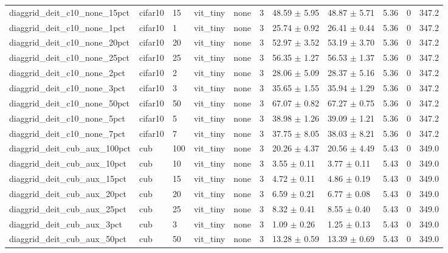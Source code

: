\begin{tabular}{lllllllllll}
diaggrid_deit_c10_none_15pct & cifar10 & 15 & vit_tiny & none & 3 & 48.59 $\pm$ 5.95 & 48.87 $\pm$ 5.71 & 5.36 & 0 & 347.2 \\
diaggrid_deit_c10_none_1pct & cifar10 & 1 & vit_tiny & none & 3 & 25.74 $\pm$ 0.92 & 26.41 $\pm$ 0.44 & 5.36 & 0 & 347.2 \\
diaggrid_deit_c10_none_20pct & cifar10 & 20 & vit_tiny & none & 3 & 52.97 $\pm$ 3.52 & 53.19 $\pm$ 3.70 & 5.36 & 0 & 347.2 \\
diaggrid_deit_c10_none_25pct & cifar10 & 25 & vit_tiny & none & 3 & 56.35 $\pm$ 1.27 & 56.53 $\pm$ 1.37 & 5.36 & 0 & 347.2 \\
diaggrid_deit_c10_none_2pct & cifar10 & 2 & vit_tiny & none & 3 & 28.06 $\pm$ 5.09 & 28.37 $\pm$ 5.16 & 5.36 & 0 & 347.2 \\
diaggrid_deit_c10_none_3pct & cifar10 & 3 & vit_tiny & none & 3 & 35.65 $\pm$ 1.55 & 35.94 $\pm$ 1.29 & 5.36 & 0 & 347.2 \\
diaggrid_deit_c10_none_50pct & cifar10 & 50 & vit_tiny & none & 3 & 67.07 $\pm$ 0.82 & 67.27 $\pm$ 0.75 & 5.36 & 0 & 347.2 \\
diaggrid_deit_c10_none_5pct & cifar10 & 5 & vit_tiny & none & 3 & 38.98 $\pm$ 1.26 & 39.09 $\pm$ 1.21 & 5.36 & 0 & 347.2 \\
diaggrid_deit_c10_none_7pct & cifar10 & 7 & vit_tiny & none & 3 & 37.75 $\pm$ 8.05 & 38.03 $\pm$ 8.21 & 5.36 & 0 & 347.2 \\
diaggrid_deit_cub_aux_100pct & cub & 100 & vit_tiny & none & 3 & 20.26 $\pm$ 4.37 & 20.56 $\pm$ 4.49 & 5.43 & 0 & 349.0 \\
diaggrid_deit_cub_aux_10pct & cub & 10 & vit_tiny & none & 3 & 3.55 $\pm$ 0.11 & 3.77 $\pm$ 0.11 & 5.43 & 0 & 349.0 \\
diaggrid_deit_cub_aux_15pct & cub & 15 & vit_tiny & none & 3 & 4.72 $\pm$ 0.11 & 4.86 $\pm$ 0.19 & 5.43 & 0 & 349.0 \\
diaggrid_deit_cub_aux_20pct & cub & 20 & vit_tiny & none & 3 & 6.59 $\pm$ 0.21 & 6.77 $\pm$ 0.08 & 5.43 & 0 & 349.0 \\
diaggrid_deit_cub_aux_25pct & cub & 25 & vit_tiny & none & 3 & 8.32 $\pm$ 0.41 & 8.55 $\pm$ 0.40 & 5.43 & 0 & 349.0 \\
diaggrid_deit_cub_aux_3pct & cub & 3 & vit_tiny & none & 3 & 1.09 $\pm$ 0.26 & 1.25 $\pm$ 0.13 & 5.43 & 0 & 349.0 \\
diaggrid_deit_cub_aux_50pct & cub & 50 & vit_tiny & none & 3 & 13.28 $\pm$ 0.59 & 13.39 $\pm$ 0.69 & 5.43 & 0 & 349.0 \\

\end{tabular}

